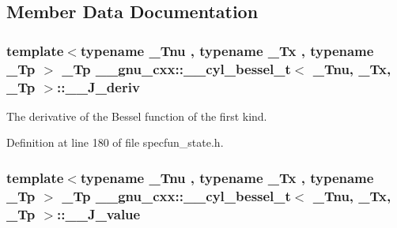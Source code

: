 \subsection{Member Data Documentation}
\subsubsection[{\texorpdfstring{\+\_\+\+\_\+\+J\+\_\+deriv}{__J_deriv}}]{\setlength{\rightskip}{0pt plus 5cm}template$<$typename \+\_\+\+Tnu , typename \+\_\+\+Tx , typename \+\_\+\+Tp $>$ \+\_\+\+Tp {\bf \+\_\+\+\_\+gnu\+\_\+cxx\+::\+\_\+\+\_\+cyl\+\_\+bessel\+\_\+t}$<$ \+\_\+\+Tnu, \+\_\+\+Tx, \+\_\+\+Tp $>$\+::\+\_\+\+\_\+\+J\+\_\+deriv}\hypertarget{struct____gnu__cxx_1_1____cyl__bessel__t_aa87001a6f705e130961ade4ff32b8557}{}\label{struct____gnu__cxx_1_1____cyl__bessel__t_aa87001a6f705e130961ade4ff32b8557}


The derivative of the Bessel function of the first kind. 



Definition at line 180 of file specfun\+\_\+state.\+h.

\subsubsection[{\texorpdfstring{\+\_\+\+\_\+\+J\+\_\+value}{__J_value}}]{\setlength{\rightskip}{0pt plus 5cm}template$<$typename \+\_\+\+Tnu , typename \+\_\+\+Tx , typename \+\_\+\+Tp $>$ \+\_\+\+Tp {\bf \+\_\+\+\_\+gnu\+\_\+cxx\+::\+\_\+\+\_\+cyl\+\_\+bessel\+\_\+t}$<$ \+\_\+\+Tnu, \+\_\+\+Tx, \+\_\+\+Tp $>$\+::\+\_\+\+\_\+\+J\+\_\+value}\hypertarget{struct____gnu__cxx_1_1____cyl__bessel__t_ad304cc5e26133341ec42940f54f551f9}{}\label{struct____gnu__cxx_1_1____cyl__bessel__t_ad304cc5e26133341ec42940f54f551f9}



